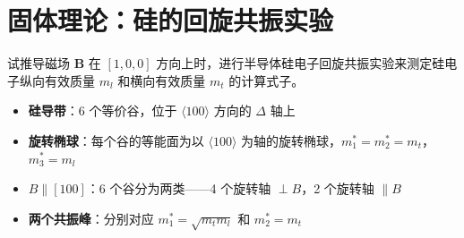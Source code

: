 \section{固体理论：硅的回旋共振实验}
\label{sec:silicon-cyclotron}

\begin{modelbox}[题目：由硅回旋共振实验测定纵向和横向有效质量]
试推导磁场 $\bm{B}$ 在 $[1,0,0]$ 方向上时，进行半导体硅电子回旋共振实验来测定硅电子纵向有效质量 $m_l$ 和横向有效质量 $m_t$ 的计算式子。
\end{modelbox}

\begin{tipbox}[考点快速分析]
\begin{itemize}
    \item \textbf{硅导带}：6 个等价谷，位于 $\langle100\rangle$ 方向的 $\Delta$ 轴上
    \item \textbf{旋转椭球}：每个谷的等能面为以 $\langle100\rangle$ 为轴的旋转椭球，$m_1^*=m_2^*=m_t$，$m_3^*=m_l$
    \item \textbf{$B\parallel[100]$}：6 个谷分为两类——4 个旋转轴 $\perp B$，2 个旋转轴 $\parallel B$
    \item \textbf{两个共振峰}：分别对应 $m_1^*=\sqrt{m_tm_l}$ 和 $m_2^*=m_t$
\end{itemize}
\end{tipbox}

